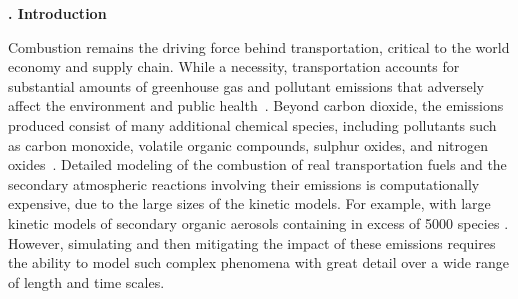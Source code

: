 \documentclass[preprint, 12pt]{elsarticle}
\renewcommand{\section}%
              [1]%
              {%
               \bgroup%
               \flushleft%
               \small\bf%
               \stepcounter{section}%
               \arabic{section}. #1%
               \par%
               \egroup%
              }%
\newcommand{\sectionOne}[1]{\section{#1} \addvspace{10pt}}
\newcommand{\chapter}[1]{}
\begin{document}
    \chapter{Extending generalized preconditioning to accelerate simulations of coupled reactor and surface systems}


\chapter{Generalized preconditioning for accelerating simulations with large kinetic models}

\clearpage

\sectionOne{Introduction}

Combustion remains the driving force behind transportation, critical to the world economy and supply chain.
While a necessity, transportation accounts for substantial amounts of greenhouse gas and pollutant emissions that adversely affect the environment and public health~\cite{van_fan_review_2018, manisalidis_environmental_2020}.
Beyond carbon dioxide, the emissions produced consist of many additional chemical species, including pollutants such as carbon monoxide, volatile organic compounds, sulphur oxides, and nitrogen oxides~\cite{van_fan_review_2018}.
Detailed modeling of the combustion of real transportation fuels and the secondary atmospheric reactions involving their emissions is computationally expensive, due to the large sizes of the kinetic models.
For example, with large kinetic models of secondary organic aerosols containing in excess of 5000 species \cite{li_modeling_2015}.
However, simulating and then mitigating the impact of these emissions requires the ability to model such complex phenomena with great detail over a wide range of length and time scales.
\end{document}
